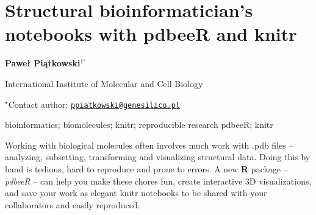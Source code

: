 \documentclass[\main/boa.tex]{subfiles}
\begin{document}
\section{Structural bioinformatician's notebooks with pdbeeR and knitr}

\begin{center}
  {\bf {} Paweł Piątkowski$^{1^\star}$}
\end{center}

\vskip 0.3cm

\begin{affiliations}
\begin{enumerate}
\begin{minipage}{0.915\textwidth}
\centering
\item International Institute of Molecular and Cell Biology \\[-2pt]
\end{minipage}
\end{enumerate}
$^\star$Contact author: \href{mailto:ppiatkowski@genesilico.pl}{\nolinkurl{ppiatkowski@genesilico.pl}}\\
\end{affiliations}

\vskip 0.5cm

\begin{minipage}{0.915\textwidth}
\keywords bioinformatics; biomolecules; knitr; reproducible research
\packages {} pdbeeR;  knitr
\end{minipage}

\vskip 0.8cm

Working with biological molecules often involves much work with .pdb
files -- analyzing, subsetting, transforming and visualizing structural
data. Doing this by hand is tedious, hard to reproduce and prone to
errors. A new \textbf{R} package -- \emph{pdbeeR} -- can help you make
these chores fun, create interactive 3D visualizations, and save your work
as elegant knitr notebooks to be shared with your collaborators and easily
reproduced.
\end{document}
